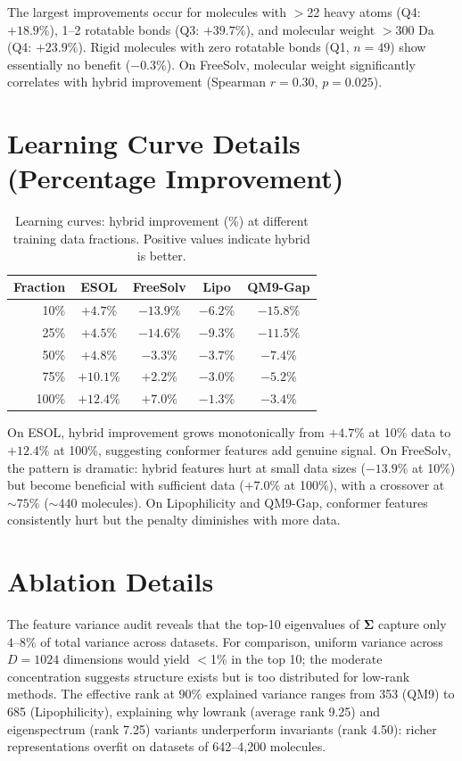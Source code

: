 \documentclass[sigconf]{acmart}
\begin{document}
The largest improvements occur for molecules with $>$22 heavy atoms (Q4: $+18.9\%$), 1--2 rotatable bonds (Q3: $+39.7\%$), and molecular weight $>$300 Da (Q4: $+23.9\%$). Rigid molecules with zero rotatable bonds (Q1, $n{=}49$) show essentially no benefit ($-0.3\%$). On FreeSolv, molecular weight significantly correlates with hybrid improvement (Spearman $r = 0.30$, $p = 0.025$).

\section{Learning Curve Details (Percentage Improvement)}
\label{app:learning_pct}

\begin{table}[ht]
\caption{Learning curves: hybrid improvement (\%) at different training data fractions. Positive values indicate hybrid is better.}
\label{tab:learning}
\centering
\small
\begin{tabular}{@{}rcccc@{}}
\toprule
Fraction & ESOL & FreeSolv & Lipo & QM9-Gap \\
\midrule
10\%  & $+4.7\%$  & $-13.9\%$ & $-6.2\%$  & $-15.8\%$ \\
25\%  & $+4.5\%$  & $-14.6\%$ & $-9.3\%$  & $-11.5\%$ \\
50\%  & $+4.8\%$  & $-3.3\%$  & $-3.7\%$  & $-7.4\%$  \\
75\%  & $+10.1\%$ & $+2.2\%$  & $-3.0\%$  & $-5.2\%$  \\
100\% & $+12.4\%$ & $+7.0\%$  & $-1.3\%$  & $-3.4\%$  \\
\bottomrule
\end{tabular}
\end{table}

On ESOL, hybrid improvement grows monotonically from $+4.7\%$ at 10\% data to $+12.4\%$ at 100\%, suggesting conformer features add genuine signal. On FreeSolv, the pattern is dramatic: hybrid features hurt at small data sizes ($-13.9\%$ at 10\%) but become beneficial with sufficient data ($+7.0\%$ at 100\%), with a crossover at ${\sim}75\%$ (${\sim}440$ molecules). On Lipophilicity and QM9-Gap, conformer features consistently hurt but the penalty diminishes with more data.

\section{Ablation Details}
\label{app:ablation}

The feature variance audit reveals that the top-10 eigenvalues of $\boldsymbol{\Sigma}$ capture only $4$--$8\%$ of total variance across datasets. For comparison, uniform variance across $D{=}1024$ dimensions would yield $<$1\% in the top 10; the moderate concentration suggests structure exists but is too distributed for low-rank methods. The effective rank at $90\%$ explained variance ranges from 353 (QM9) to 685 (Lipophilicity), explaining why lowrank (average rank 9.25) and eigenspectrum (rank 7.25) variants underperform invariants (rank 4.50): richer representations overfit on datasets of 642--4,200 molecules.
\end{document}

